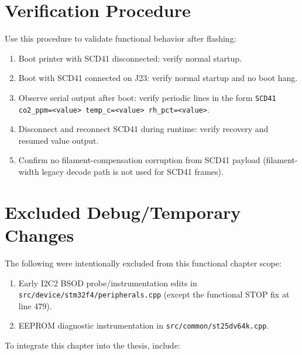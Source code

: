 \section{Verification Procedure}
Use this procedure to validate functional behavior after flashing:
\begin{enumerate}
  \item Boot printer with SCD41 disconnected: verify normal startup.
  \item Boot with SCD41 connected on J23: verify normal startup and no boot hang.
  \item Observe serial output after boot: verify periodic lines in the form
  \texttt{SCD41 co2\_ppm=<value> temp\_c=<value> rh\_pct=<value>}.
  \item Disconnect and reconnect SCD41 during runtime: verify recovery and resumed value output.
  \item Confirm no filament-compensation corruption from SCD41 payload (filament-width legacy decode path is not used for SCD41 frames).
\end{enumerate}

\section{Excluded Debug/Temporary Changes}
The following were intentionally excluded from this functional chapter scope:
\begin{enumerate}
  \item Early I2C2 BSOD probe/instrumentation edits in \texttt{src/device/stm32f4/peripherals.cpp} (except the functional STOP fix at line 479).
  \item EEPROM diagnostic instrumentation in \texttt{src/common/st25dv64k.cpp}.
\end{enumerate}

To integrate this chapter into the thesis, include:
\begin{lstlisting}[language={[LaTeX]TeX},caption={Chapter include example},label={lst:chapter-include}]

\end{lstlisting}
